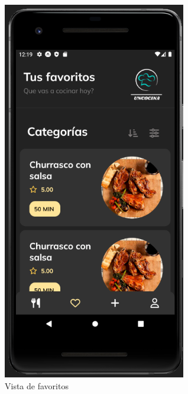 \begin{figure}[!h]
  \centering
  \includegraphics[width=8cm, scale=1]{Images/Imagenes/favoritos.png}
  \caption{Vista de favoritos}
  \label{fig:favoritos}
\end{figure}

